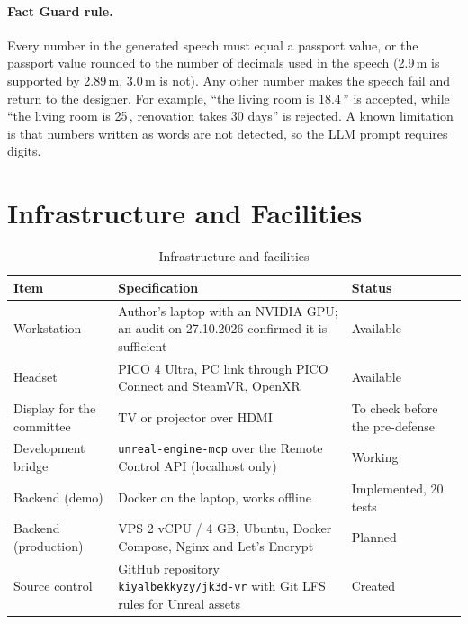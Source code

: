 \paragraph{Fact Guard rule.} Every number in the generated speech must equal a passport value, or the passport value rounded to the number of decimals used in the speech (2.9\,m is supported by 2.89\,m, 3.0\,m is not). Any other number makes the speech fail and return to the designer. For example, \enquote{the living room is 18.4\,\sqm{}} is accepted, while \enquote{the living room is 25\,\sqm{}, renovation takes 30 days} is rejected. A known limitation is that numbers written as words are not detected, so the LLM prompt requires digits.

\section{Infrastructure and Facilities}

\begin{table}[H]
\centering
\begin{tightblock}
\begin{tabularx}{\textwidth}{P{3.4cm} L P{2.6cm}}
\toprule
\textbf{Item} & \textbf{Specification} & \textbf{Status} \\
\midrule
Workstation & Author's laptop with an NVIDIA GPU; an audit on 27.10.2026 confirmed it is sufficient & Available \\
Headset & PICO 4 Ultra, PC link through PICO Connect and SteamVR, OpenXR & Available \\
Display for the committee & TV or projector over HDMI & To check before the pre-defense \\
Development bridge & \texttt{unreal-engine-mcp} over the Remote Control API (localhost only) & Working \\
Backend (demo) & Docker on the laptop, works offline & Implemented, 20 tests \\
Backend (production) & VPS 2 vCPU / 4 GB, Ubuntu, Docker Compose, Nginx and Let's Encrypt & Planned \\
Source control & GitHub repository \texttt{kiyalbekkyzy/jk3d-vr} with Git LFS rules for Unreal assets & Created \\
\bottomrule
\end{tabularx}
\end{tightblock}
\caption{Infrastructure and facilities}
\label{tab:infra}
\end{table}

